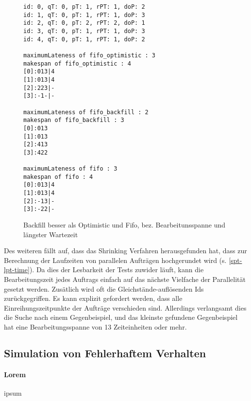 \begin{figure}
	\centering
	\begin{verbatim}
id: 0, qT: 0, pT: 1, rPT: 1, doP: 2
id: 1, qT: 0, pT: 1, rPT: 1, doP: 3
id: 2, qT: 0, pT: 2, rPT: 2, doP: 1
id: 3, qT: 0, pT: 1, rPT: 1, doP: 3
id: 4, qT: 0, pT: 1, rPT: 1, doP: 2

maximumLateness of fifo_optimistic : 3
makespan of fifo_optimistic : 4
[0]:013|4
[1]:013|4
[2]:223|-
[3]:-1-|-

maximumLateness of fifo_backfill : 2
makespan of fifo_backfill : 3
[0]:013
[1]:013
[2]:413
[3]:422

maximumLateness of fifo : 3
makespan of fifo : 4
[0]:013|4
[1]:013|4
[2]:-13|-
[3]:-22|-
\end{verbatim}
\caption{Backfill besser als Optimistic und Fifo, bez. Bearbeitunsspanne und längster Wartezeit}
\label{everything}
\end{figure}

Des weiteren fällt auf, dass das Shrinking Verfahren herausgefunden hat, dass zur Berechnung der Laufzeiten von parallelen Aufträgen hochgerundet wird (s. \ref{spt-lpt-time}). Da dies der Lesbarkeit der Tests zuwider läuft, kann die Bearbeitungszeit jedes Auftrags einfach auf das nächste Vielfache der Parallelität gesetzt werden.
Zusätlich wird oft die Gleichstände-auflösenden Ids zurückgegriffen. Es kann explizit gefordert werden, dass alle Einreihungszeitpunkte der Aufträge verschieden sind. Allerdings verlangsamt dies die Suche nach einem Gegenbeispiel, und das kleinste gefundene Gegenbeispiel hat eine Bearbeitungsspanne von 13 Zeiteinheiten oder mehr.\\
\FloatBarrier

\subsection{Simulation von Fehlerhaftem Verhalten}
\label{simErrors}

\paragraph{Lorem}
ipsum